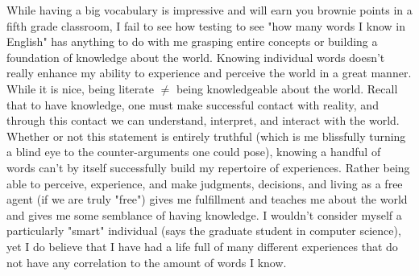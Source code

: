 \documentclass[11pt]{article}
\begin{document}
While having a big vocabulary is impressive and will earn you brownie points in a fifth grade classroom, I fail to see how testing to see "how many words I know in English" has anything to do with me grasping entire concepts or building a foundation of knowledge about the world. Knowing individual words doesn't really enhance my ability to experience and perceive the world in a great manner. While it is nice, being literate $\ne$ being knowledgeable about the world. Recall that to have knowledge, one must make successful contact with reality, and through this contact we can understand, interpret, and interact with the world. Whether or not this statement is entirely truthful (which is me blissfully turning a blind eye to the counter-arguments one could pose), knowing a handful of words can't by itself successfully build my repertoire of experiences. Rather being able to perceive, experience, and make judgments, decisions, and living as a free agent (if we are truly "free") gives me fulfillment and teaches me about the world and gives me some semblance of having knowledge. I wouldn't consider myself a particularly "smart" individual (says the graduate student in computer science), yet I do believe that I have had a life full of many different experiences that do not have any correlation to the amount of words I know.

\end{document}
